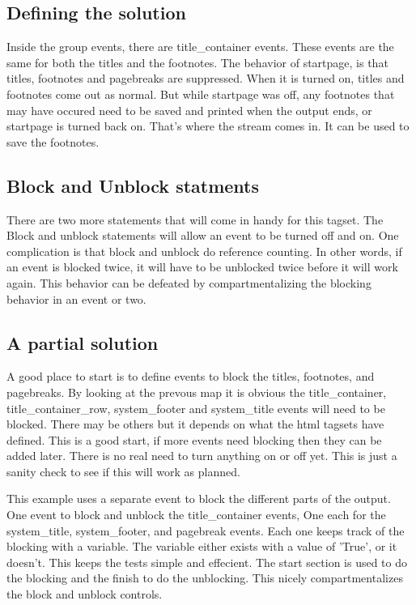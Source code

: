 \subsection{Defining the solution}
Inside the group events, there are title\_container events.  These events
are the same for both the titles and the footnotes.  The behavior of startpage, is
that titles, footnotes and pagebreaks are suppressed.  When it is turned on, titles
and footnotes come out as normal.  But while startpage was off, any footnotes that 
may have occured need to be saved and printed when the output ends, or startpage is
turned back on.   That's where the stream comes in.  It can be used to save the footnotes.

\subsection{Block and Unblock statments}
There are two more statements that will come in handy for this tagset.  The Block and unblock
statements will allow an event to be turned off and on.  One complication is that block and
unblock do reference counting.  In other words, if an event is blocked twice, it will have
to be unblocked twice before it will work again.  This behavior can be defeated by 
compartmentalizing the blocking behavior in an event or two.

\subsection{A partial solution}
A good place to start is to define events to block the titles, footnotes, and pagebreaks.  
By looking at the prevous map it is obvious  the title\_container, title\_container\_row,
system\_footer and system\_title events will need to be blocked.  There may be others
but it depends on what the html tagsets have defined.
This is a good start, if more events need blocking then they can be added later. There 
is no real need to turn anything on or off yet.  This is just a sanity check to see if
this will work as planned.

This example uses a separate event to block the different parts of
the output.  One event to block and unblock the title\_container
events, One each for the system\_title, system\_footer, and pagebreak
events. Each one keeps track of the blocking with a variable.  The
variable either exists with a value of 'True', or it doesn't.  This
keeps the tests simple and effecient. The start section is used to
do the blocking and the finish to do the unblocking. This nicely
compartmentalizes the block and unblock controls.

